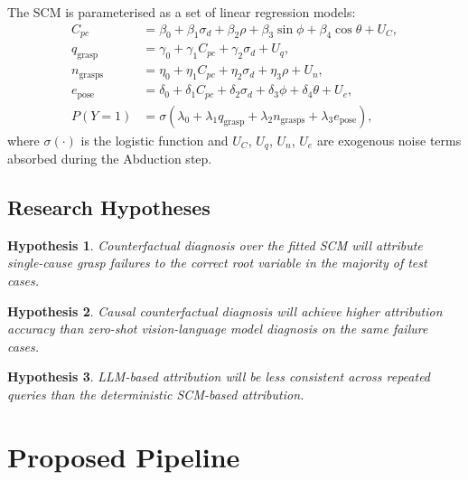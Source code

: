 \documentclass[journal]{IEEEtran}
\newtheorem{hypothesis}{Hypothesis}
\begin{document}
The SCM is parameterised as a set of linear regression models:
\begin{align}
  C_{pc}              &= \beta_0 + \beta_1\sigma_d + \beta_2\rho
                         + \beta_3\sin\phi + \beta_4\cos\theta
                         + U_C, \label{eq:cpc} \\
  q_{\text{grasp}}    &= \gamma_0 + \gamma_1 C_{pc} + \gamma_2\sigma_d
                         + U_q, \label{eq:qg} \\
  n_{\text{grasps}}   &= \eta_0 + \eta_1 C_{pc} + \eta_2\sigma_d
                         + \eta_3\rho + U_n, \label{eq:ng} \\
  e_{\text{pose}}     &= \delta_0 + \delta_1 C_{pc} + \delta_2\sigma_d
                         + \delta_3\phi + \delta_4\theta
                         + U_e, \label{eq:ep} \\
  P(Y{=}1)            &= \sigma\!\left(\lambda_0
                         + \lambda_1 q_{\text{grasp}}
                         + \lambda_2 n_{\text{grasps}}
                         + \lambda_3 e_{\text{pose}}\right), \label{eq:Y}
\end{align}
where $\sigma(\cdot)$ is the logistic function and
$U_C$, $U_q$, $U_n$, $U_e$ are exogenous noise terms absorbed during
the Abduction step.

\subsection{Research Hypotheses}

\begin{hypothesis}
  Counterfactual diagnosis over the fitted SCM will attribute
  single-cause grasp failures to the correct root variable in
  the majority of test cases.
\end{hypothesis}
\begin{hypothesis}
  Causal counterfactual diagnosis will achieve higher attribution
  accuracy than zero-shot vision-language model diagnosis on the
  same failure cases.
\end{hypothesis}
\begin{hypothesis}
  LLM-based attribution will be less consistent across repeated
  queries than the deterministic SCM-based attribution.
\end{hypothesis}

\section{Proposed Pipeline}
\label{sec:method}
\end{document}
